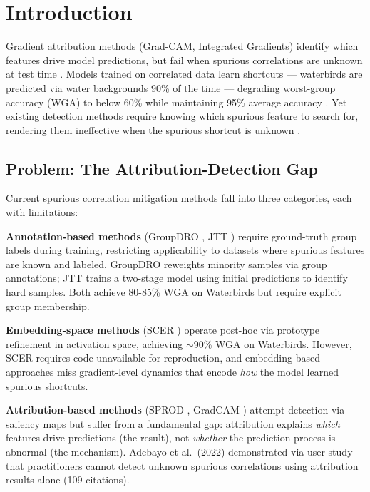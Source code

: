 \section{Introduction}

Gradient attribution methods (Grad-CAM, Integrated Gradients) identify which features drive model predictions, but fail when spurious correlations are unknown at test time \cite{adebayo2022post}. Models trained on correlated data learn shortcuts --- waterbirds are predicted via water backgrounds 90\% of the time --- degrading worst-group accuracy (WGA) to below 60\% while maintaining 95\% average accuracy \cite{sagawa2019distributionally}. Yet existing detection methods require knowing which spurious feature to search for, rendering them ineffective when the spurious shortcut is unknown \cite{adebayo2022post}.

\subsection{Problem: The Attribution-Detection Gap}

Current spurious correlation mitigation methods fall into three categories, each with limitations:

\textbf{Annotation-based methods} (GroupDRO \cite{sagawa2019distributionally}, JTT \cite{liu2021just}) require ground-truth group labels during training, restricting applicability to datasets where spurious features are known and labeled. GroupDRO reweights minority samples via group annotations; JTT trains a two-stage model using initial predictions to identify hard samples. Both achieve 80-85\% WGA on Waterbirds but require explicit group membership.

\textbf{Embedding-space methods} (SCER \cite{park2025spurious}) operate post-hoc via prototype refinement in activation space, achieving $\sim$90\% WGA on Waterbirds. However, SCER requires code unavailable for reproduction, and embedding-based approaches miss gradient-level dynamics that encode \emph{how} the model learned spurious shortcuts.

\textbf{Attribution-based methods} (SPROD \cite{lee2025detecting}, GradCAM \cite{selvaraju2017grad}) attempt detection via saliency maps but suffer from a fundamental gap: attribution explains \emph{which} features drive predictions (the result), not \emph{whether} the prediction process is abnormal (the mechanism). Adebayo et al.~(2022) demonstrated via user study that practitioners cannot detect unknown spurious correlations using attribution results alone (109 citations).

